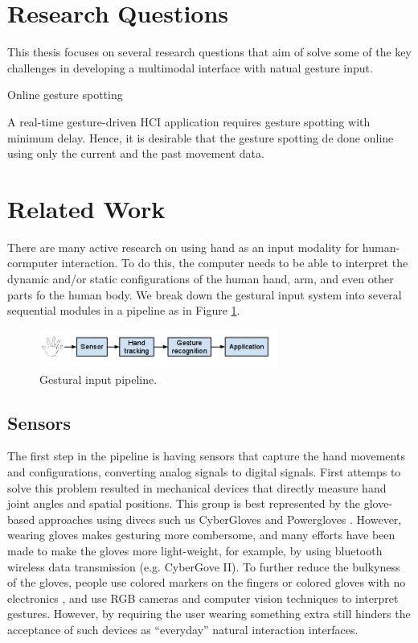 \cite{wobbrock09}

\section{Research Questions}
This thesis focuses on several research questions that aim of solve some of the
key challenges in developing a multimodal interface with natual gesture input.

Online gesture spotting

A real-time gesture-driven HCI application requires gesture spotting with
minimum delay. Hence, it is desirable that the gesture spotting de done online
using only the current and the past movement data.

\section{Related Work}
There are many active research on using hand as an input modality for
human-cormputer interaction. To do this, the computer needs to be able to
interpret the dynamic and/or static configurations of the human hand, arm, and
even other parts fo the human body. We break down the gestural input
system into several sequential modules in a pipeline as in Figure
\ref{fig:pipeline}.

\begin{figure}[h]
  \centering
  \includegraphics[width=0.7\textwidth]{figures/pipeline.png} 
  \caption{Gestural input pipeline.}
  \label{fig:pipeline}
\end{figure}

\subsection{Sensors}
The first step in the pipeline is having sensors that capture the hand movements
and configurations, converting analog signals to digital signals. First attemps
to solve this problem resulted in mechanical devices that directly measure hand
joint angles and spatial positions. This group is best represented by the
glove-based approaches using divecs such us CyberGloves \cite{fels09} and
Powergloves \cite{kadous02}. However, wearing gloves makes gesturing more
combersome, and many efforts have been made to make the gloves more
light-weight, for example, by using bluetooth wireless data transmission (e.g.
CyberGove II). To further reduce the bulkyness of the gloves, people use colored markers on the fingers
\cite{mistry09} or colored gloves with no electronics \cite{Wang09}, and use RGB
cameras and computer vision techniques to interpret gestures. However, by
requiring the user wearing something extra still hinders the acceptance of
such devices as ``everyday'' natural interaction interfaces. 

